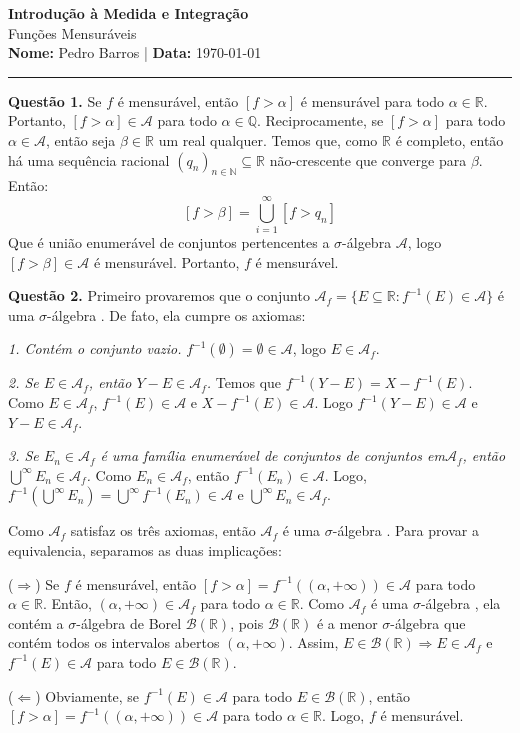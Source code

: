 \documentclass[12pt, a4paper]{article}
\newenvironment{solution}[1]{\par\vspace{1.2em}\noindent\textbf{Questão #1.}}{\par\vspace{0.5em}}
\newcommand{\R}{\mathbb{R}}
\newcommand{\N}{\mathbb{N}}
\newcommand{\salg}{$\sigma$-álgebra }
\newcommand{\A}{\mathcal{A}}
\newcommand{\B}{\mathcal{B}}
\begin{document}
\thispagestyle{empty} %
\begin{center}
    {\Large \textbf{Introdução à Medida e Integração}} \\[0.4em]
    {\large Funções Mensuráveis} \\[0.4em]
    \textbf{Nome:} Pedro Barros \quad | \quad \textbf{Data:} \today
\end{center}

\hrule
\vspace{1.5em}

\begin{solution}{1}
Se $f$ é mensurável, então $[f > \alpha]$ é mensurável para todo $\alpha \in \mathbb{R}$. Portanto, $[f > \alpha] \in \mathcal{A}$ para todo $\alpha \in \mathbb{Q}$. Reciprocamente, se $[f>\alpha]$ para todo $\alpha \in \mathcal{A}$, então seja $\beta \in \R$ um real qualquer. Temos que, como $\R$ é completo, então há uma sequência racional $(q_n)_{n\in \N} \subseteq \R$ não-crescente que converge para $\beta$. Então:
\[[f>\beta] = \bigcup_{i=1}^\infty [f>q_n]\]
Que é união enumerável de conjuntos pertencentes a $\sigma$-álgebra $\mathcal{A}$, logo $[f>\beta]\in \mathcal{A}$ é mensurável. Portanto, $f$ é mensurável.

\end{solution}

\begin{solution}{2}
    Primeiro provaremos que o conjunto $\A_f = \{E\subseteq \R : f^{-1}(E) \in \A\}$ é uma \salg. De fato, ela cumpre os axiomas:

    \textit{1. Contém o conjunto vazio.}
    $f^{-1} (\emptyset) = \emptyset \in \A$, logo $E \in \A_f$.

    \textit{2. Se $E\in \A_f$, então $Y - E \in \A_f$.} Temos que $f^{-1}(Y-E) = X - f^{-1} (E)$. Como $E \in \A_f$, $f^{-1} (E)\in \A$ e $X - f^{-1} (E) \in \A$. Logo $f^{-1}(Y-E) \in \A$ e $Y-E \in \A_f$.

    \textit{3. Se $E_n \in \A_f$ é uma família enumerável de conjuntos de conjuntos em$\A_f$, então $\bigcup^\infty E_n \in \A_f$.} Como $E_n \in \A_f$, então $f^{-1}(E_n) \in \A$. Logo, $f^{-1}(\bigcup^\infty E_n) = \bigcup^\infty f^{-1}(E_n) \in \A$ e $\bigcup^\infty E_n \in \A_f$. 

    Como $\A_f$ satisfaz os três axiomas, então $\A_f$ é uma \salg. Para provar a equivalencia, separamos as duas implicações:

    ($\Rightarrow$) Se $f$ é mensurável, então $[f > \alpha] = f^{-1}((\alpha, +\infty)) \in \A$ para todo $\alpha \in \R$. Então, $(\alpha, +\infty) \in \A_f$ para todo $\alpha \in \R$. Como $\A_f$ é uma \salg, ela contém a \salg de Borel $\B(\R)$, pois $\B(\R)$ é a menor \salg  que contém todos os intervalos abertos $(\alpha, +\infty)$. Assim, $E \in \B(\R) \Rightarrow E \in \A_f$ e $f^{-1}(E) \in \A$ para todo $E \in \B(\R)$.

    ($\Leftarrow$) Obviamente, se $f^{-1}(E) \in \A$ para todo $E \in \B(\R)$, então $[f > \alpha] = f^{-1}((\alpha,\allowbreak +\infty)) \in \A$ para todo $\alpha \in \R$. Logo, $f$ é mensurável.    
\end{solution}
\end{document}
